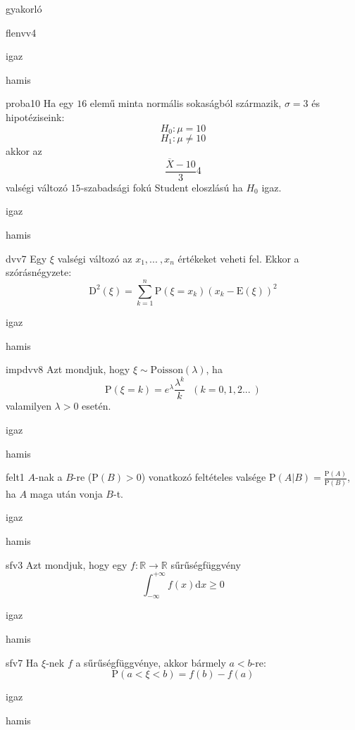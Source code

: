 \documentclass[12pt]{article}
\begin{document}
\begin{quiz}{gyakorló}
\begin{multi}[feedback={Def.}]{flenvv4}
$$$$
\item* igaz
\item hamis
\end{multi}
\begin{multi}[feedback={A feltételek mellett a fenti mennyiség sztenderd normális, ha $H_0$ igaz.}]{proba10}
Ha egy $16$ elemű minta normális sokaságból származik, $\sigma=3$ és hipotéziseink:
$$
H_0: \mu=10
$$
$$
H_1: \mu\neq 10
$$
akkor az 
$$
\frac{\overline{X}-10}{3}4
$$
valségi változó $15$-szabadsági fokú Student eloszlású ha $H_0$ igaz.
\item igaz
\item* hamis
\end{multi}
\begin{multi}[feedback={Def.}]{dvv7}
Egy $\xi$ valségi változó az $x_1,{...\:}, x_n$ értékeket veheti fel. Ekkor a szórásnégyzete:
$$
\mathrm{D}^2(\xi)=\sum_{k=1}^n \mathrm{P}(\xi=x_k)(x_k-\mathrm{E}(\xi))^2
$$
\item* igaz
\item hamis
\end{multi}
\begin{multi}[feedback={Def.}]{impdvv8}
Azt mondjuk, hogy $\xi\sim \mathrm{Poisson}(\lambda)$, ha 
$$
\mathrm{P}(\xi=k)=e^{\lambda}\frac{\lambda^k}{k}\ \ \ (k=0,1,2{...\:} )
$$ 
valamilyen $\lambda>0$ esetén.
\item igaz
\item* hamis
\end{multi}
\begin{multi}[feedback={Def.+$P(AB)=P(A)$ a feltételekből.}]{felt1}
$A$-nak a $B$-re ($\mathrm{P}(B)>0$) vonatkozó feltételes valsége $\mathrm{P}(A|B)=\frac{\mathrm{P}(A)}{\mathrm{P}(B)}$, ha $A$ maga után vonja $B$-t.
\item* igaz
\item hamis
\end{multi}
\begin{multi}[feedback={$f\ge 0$ fontos (monoton nemcsökkenő $F$-nek a deriváltja)}]{sfv3}
Azt mondjuk, hogy egy $f:\mathbb{R}\to \mathbb{R}$ sűrűségfüggvény 
$$
\int_{-\infty}^{+\infty}f(x)\mathrm{d } x\ge 0
$$
\item igaz
\item* hamis
\end{multi}
\begin{multi}[feedback={Def.}]{sfv7}
Ha $\xi$-nek $f$ a sűrűségfüggvénye, akkor bármely $a<b$-re:
$$
\mathrm{P}(a<\xi<b)=f(b)-f(a)
$$
\item igaz
\item* hamis

\end{multi}
\end{quiz}
\end{document}

